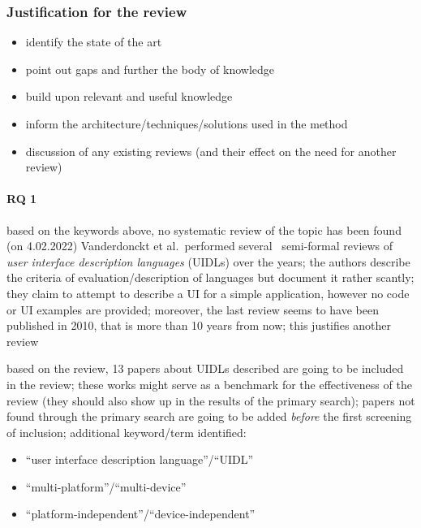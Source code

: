\subsubsection[Justification]{Justification for the review}
\begin{itemize}
    \item identify the state of the art
    \item point out gaps and further the body of knowledge
    \item build upon relevant and useful knowledge
    \item inform the architecture/techniques/solutions used in the method
    \item discussion of any existing reviews (and their effect on the need for another review)
\end{itemize}

\paragraph{RQ 1}
based on the keywords above, no systematic review of the topic has been found (on 4.02.2022)
Vanderdonckt et al.\ performed several~\cite{souchon_review_2003,guerrero_garcia_theoretical_2009,guerrero_garcia_theoretical_2011} semi-formal reviews of
\emph{user interface description languages} (UIDLs) over the years;
the authors describe the criteria of evaluation/description of languages but document it rather scantly;
they claim to attempt to describe a UI for a simple application, however no code or UI examples are provided;
moreover, the last review seems to have been published in 2010, that is more than 10 years from now;
this justifies another review

based on the review, 13 papers about UIDLs described are going to be included in the review;
these works might serve as a benchmark for the effectiveness of the review (they should also show up in the results of the primary search);
papers not found through the primary search are going to be added \emph{before} the first screening of inclusion;
additional keyword/term identified:
\begin{itemize}
    \item \enquote{user interface description language}/\enquote{UIDL}
    \item \enquote{multi-platform}/\enquote{multi-device}
    \item \enquote{platform-independent}/\enquote{device-independent}
\end{itemize}

